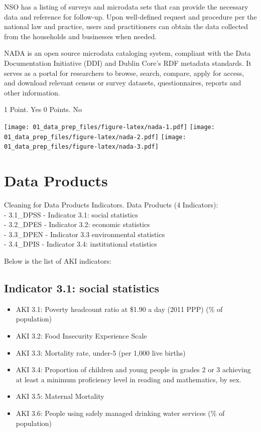 \documentclass[]{article}
\providecommand{\tightlist}{%
  \setlength{\itemsep}{0pt}\setlength{\parskip}{0pt}}
\begin{document}
NSO has a listing of surveys and microdata sets that can provide the
necessary data and reference for follow-up. Upon well-defined request
and procedure per the national law and practice, users and practitioners
can obtain the data collected from the households and businesses when
needed.

NADA is an open source microdata cataloging system, compliant with the
Data Documentation Initiative (DDI) and Dublin Core's RDF metadata
standards. It serves as a portal for researchers to browse, search,
compare, apply for access, and download relevant census or survey
datasets, questionnaires, reports and other information.

1 Point. Yes 0 Points. No

\texttt{[image: 01\_data\_prep\_files/figure-latex/nada-1.pdf]}
\texttt{[image: 01\_data\_prep\_files/figure-latex/nada-2.pdf]}
\texttt{[image: 01\_data\_prep\_files/figure-latex/nada-3.pdf]}

\hypertarget{data-products}{%
\section{Data Products}\label{data-products}}

Cleaning for Data Products Indicators. Data Products (4 Indicators):\\
- 3.1\_DPSS - Indicator 3.1: social statistics\\
- 3.2\_DPES - Indicator 3.2: economic statistics\\
- 3.3\_DPEN - Indicator 3.3 environmental statistics\\
- 3.4\_DPIS - Indicator 3.4: institutional statistics

Below is the list of AKI indicators:

\hypertarget{indicator-3.1-social-statistics}{%
\subsection{Indicator 3.1: social
statistics}\label{indicator-3.1-social-statistics}}

\begin{itemize}
\tightlist
\item
  AKI 3.1: Poverty headcount ratio at \$1.90 a day (2011 PPP) (\% of
  population)\\
\item
  AKI 3.2: Food Insecurity Experience Scale
\item
  AKI 3.3: Mortality rate, under-5 (per 1,000 live births)\\
\item
  AKI 3.4: Proportion of children and young people in grades 2 or 3
  achieving at least a minimum proficiency level in reading and
  mathematics, by sex.\\
\item
  AKI 3.5: Maternal Mortality
\item
  AKI 3.6: People using safely managed drinking water services (\% of
  population)
\end{itemize}
\end{document}
